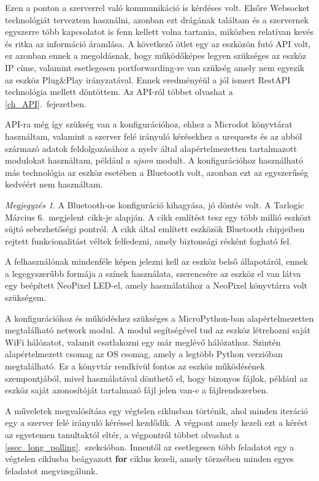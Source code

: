 \documentclass{thesis-ekf}
\theoremstyle{definition}
\theoremstyle{remark}
\newtheorem{megjegyzes}{Megjegyzés}
\begin{document}
	 Ezen a ponton a szerverrel való kommunikáció is kérdéses volt. Elsőre Websocket technológiát terveztem használni, azonban ezt drágának találtam és a szervernek egyszerre több kapcsolatot is fenn kellett volna tartania, miközben relatívan kevés és ritka az információ áramlása. A következő ötlet egy az eszközön futó API volt, ez azonban ennek a megoldásnak, hogy működőképes legyen szükséges az eszköz IP címe, valamint esetlegesen portforwarding-re van szükség amely nem egyezik az eszköz Plug\&Play irányzatával. Ennek eredményéül a jól ismert RestAPI technológia mellett döntöttem. Az API-ról többet olvashat a \ref{ch_API}.~fejezetben.
	 
	 API-ra még így szükség van a konfigurációhoz, ehhez a Microdot könyvtárat használtam, valamint a szerver felé irányuló kérésekhez a urequests és az abból származó adatok feldolgozásához a nyelv által alapértelmezetten tartalmazott modulokat használtam, például a \textit{ujson} modult. A konfigurációhoz használható más technológia az eszköz esetében a Bluetooth volt, azonban ezt az egyszerűség kedvéért nem használtam.
	 
	 \begin{megjegyzes}
	 	A Bluetooth-os konfiguráció kihagyása, jó döntés volt. A Tarlogic Március 6.~megjelent cikk-je alapján\cite{bib_esp_bluetooth}. A cikk említést tesz egy több millió eszközt sújtó sebezhetőségi pontról. A cikk által említett eszközök Bluetooth chipjeiben rejtett funkcionalitást véltek felfedezni, amely biztonsági résként fogható fel.
	 \end{megjegyzes}
	 
	 A felhasználónak mindenféle képen jelezni kell az eszköz belső állapotáról, ennek a legegyszerűbb formája a színek használata, szerencsére az eszköz el van látva egy  beépített NeoPixel LED-el, amely használatához a NeoPixel könyvtárra volt szükségem.
	 
	 A konfigurációhoz és működéshez szükséges a MicroPython-ban alapértelmezetten megtalálható network modul. A modul segítségével tud az eszköz létrehozni saját WiFi hálózatot, valamit csatlakozni egy már meglévő hálózathoz. Szintén alapértelmezett csomag az OS csomag, amely a legtöbb Python verzióban megtalálható. Ez a könyvtár rendkívül fontos az eszköz működésének szempontjából, mivel használatával dönthető el, hogy bizonyos fájlok, például az eszköz saját azonosítóját tartalmazó fájl jelen van-e a fájlrendszerben.
	 
	 A műveletek megvalósítása egy végtelen ciklusban történik, ahol minden iteráció egy a szerver felé irányuló kéréssel kezdődik. A végpont amely kezeli ezt a kérést az egyetemen tanultaktól eltér, a végpontról többet olvashat a \ref{ssec_long_polling}.~szekcióban. Innentől az esetlegesen több feladatot egy a végtelen ciklusba beágyazott \textbf{for} ciklus kezeli, amely törzsében minden egyes feladatot megvizsgálunk.
	 
\end{document}
